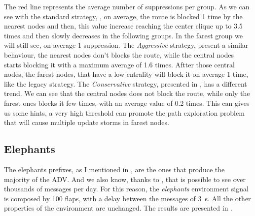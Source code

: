 The red line represents the average number of suppressions per group.
As we can see with the standard strategy, , 
on average, the route is blocked \num{1} time by the nearest nodes and then, 
this value increase reaching the center clique up to \num{3.5} times and then
slowly decreases in the following groups.
In the farest group we will still see, on average \num{1} suppression.
The \textit{Aggressive} strategy,  present
a similar behaviour, the nearest nodes don't blocks the route, while the central
nodes starts blocking it with a maximum average of \num{1.6} times.
Aftter those central nodes, the farest nodes, that have a low entrality will
block it on average \num{1} time, like the legacy strategy.
The \textit{Conservative} strategy, presented in ,
has a different trend.
We can see that the central nodes does not block the route, while only the farest
ones blocks it few times, with an average value of \num{0.2} times.
This can gives us some hints, a very high threshold can promote the path
exploration problem that will cause multiple update storms in farest nodes.


\subsection{Elephants}
\label{subsec:bgp_elephants}

The elephants prefixes, as I mentioned in ,
are the ones that produce the majority of the \ac{ADV}.
And we also know, thanks to \cite{huston2006bgp}, that is possible to see over
thousands of messages per day.
For this reason, the \textit{elephants} environment signal is composed by \num{100}
flaps, with a delay between the messages of \SI{3}{\second}.
All the other properties of the environment are unchanged.
The results are presented in .

